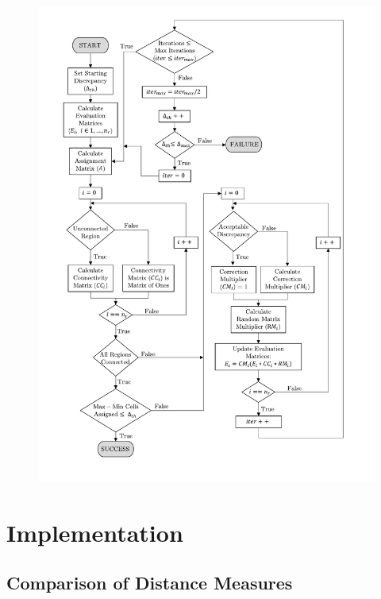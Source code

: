 \begin{figure}[h!]
	\centering
	\includegraphics[scale=0.8,trim={1.5cm 0 1.5cm 0},clip]{figs/DARP_Diagram3.pdf}
	\caption{}
	\label{fig:DARP}
\end{figure}

\section{Implementation}
\subsection{Comparison of Distance Measures}
